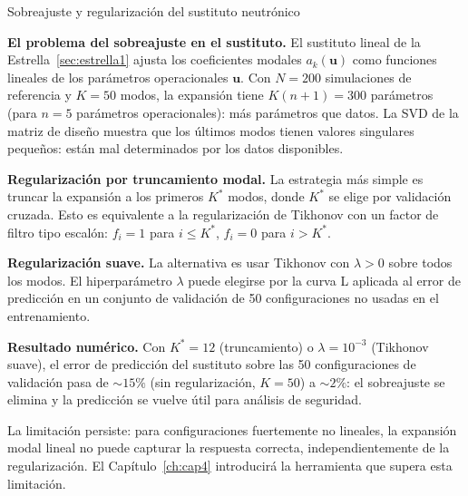 \begin{estrella}{Sobreajuste y regularización del sustituto neutrónico}
\label{sec:estrella2}

\textbf{El problema del sobreajuste en el sustituto.}
El sustituto lineal de la Estrella~\ref{sec:estrella1} ajusta los
coeficientes modales $a_k(\bm{u})$ como funciones lineales de los
parámetros operacionales $\bm{u}$. Con $N = 200$ simulaciones de
referencia y $K = 50$ modos, la expansión tiene $K(n+1) = 300$
parámetros (para $n = 5$ parámetros operacionales): más parámetros que
datos. La SVD de la matriz de diseño muestra que los últimos modos
tienen valores singulares pequeños: están mal determinados por los
datos disponibles.

\textbf{Regularización por truncamiento modal.}
La estrategia más simple es truncar la expansión a los primeros $K^*$
modos, donde $K^*$ se elige por validación cruzada. Esto es equivalente
a la regularización de Tikhonov con un factor de filtro tipo escalón:
$f_i = 1$ para $i \leq K^*$, $f_i = 0$ para $i > K^*$.

\textbf{Regularización suave.}
La alternativa es usar Tikhonov con $\lambda > 0$ sobre todos los
modos. El hiperparámetro $\lambda$ puede elegirse por la curva L
aplicada al error de predicción en un conjunto de validación de 50
configuraciones no usadas en el entrenamiento.

\textbf{Resultado numérico.}
Con $K^* = 12$ (truncamiento) o $\lambda = 10^{-3}$ (Tikhonov suave),
el error de predicción del sustituto sobre las 50 configuraciones de
validación pasa de $\sim 15\%$ (sin regularización, $K = 50$) a
$\sim 2\%$: el sobreajuste se elimina y la predicción se vuelve útil
para análisis de seguridad.

La limitación persiste: para configuraciones fuertemente no lineales, la
expansión modal lineal no puede capturar la respuesta correcta,
independientemente de la regularización. El Capítulo~\ref{ch:cap4}
introducirá la herramienta que supera esta limitación.
\end{estrella}

\printbibliography[heading=subbibliography]